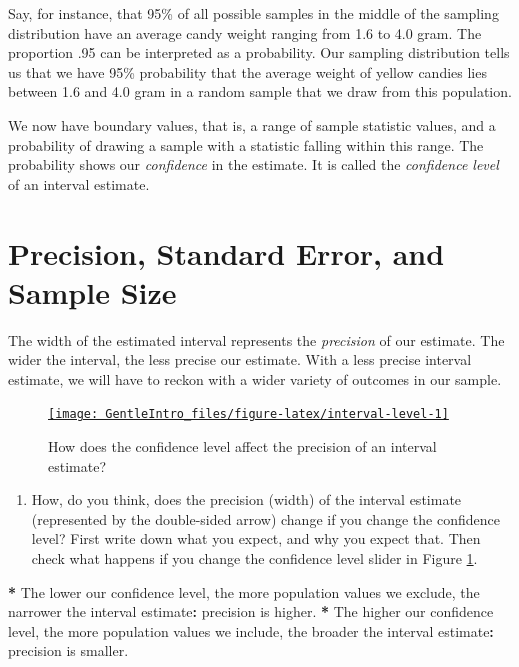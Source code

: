\documentclass[a4paper]{book}
\newenvironment{Shaded}{\begin{snugshade}}{\end{snugshade}}
\newcommand{\StringTok}[1]{\textcolor[rgb]{0.00,0.00,0.00}{#1}}
\newcommand{\OperatorTok}[1]{\textcolor[rgb]{0.00,0.00,0.00}{\textbf{#1}}}
\newcommand{\NormalTok}[1]{#1}
\providecommand{\tightlist}{%
  \setlength{\itemsep}{0pt}\setlength{\parskip}{0pt}}
\theoremstyle{definition}
\theoremstyle{definition}
\theoremstyle{definition}
\theoremstyle{remark}
\begin{document}
Say, for instance, that 95\% of all possible samples in the middle of
the sampling distribution have an average candy weight ranging from 1.6
to 4.0 gram. The proportion .95 can be interpreted as a probability. Our
sampling distribution tells us that we have 95\% probability that the
average weight of yellow candies lies between 1.6 and 4.0 gram in a
random sample that we draw from this population.

We now have boundary values, that is, a range of sample statistic
values, and a probability of drawing a sample with a statistic falling
within this range. The probability shows our \emph{confidence} in the
estimate. It is called the \emph{confidence level} of an interval
estimate.

\section{Precision, Standard Error, and Sample
Size}\label{precisionsesamplesize}

The width of the estimated interval represents the \emph{precision} of
our estimate. The wider the interval, the less precise our estimate.
With a less precise interval estimate, we will have to reckon with a
wider variety of outcomes in our sample.

\begin{figure}[H]
\href{http://82.196.4.233:3838/apps/interval-level/}{\texttt{[image: GentleIntro\_files/figure-latex/interval-level-1]} }\caption{How does the confidence level affect the precision of an interval estimate?}\label{fig:interval-level}
\end{figure}

\begin{enumerate}
\def\labelenumi{\arabic{enumi}.}
\tightlist
\item
  How, do you think, does the precision (width) of the interval estimate
  (represented by the double-sided arrow) change if you change the
  confidence level? First write down what you expect, and why you expect
  that. Then check what happens if you change the confidence level
  slider in Figure \ref{fig:interval-level}.
\end{enumerate}

\begin{Shaded}
\begin{Highlighting}[]
\OperatorTok{*}\StringTok{ }\NormalTok{The lower our confidence level, the more population values we exclude, the}
\NormalTok{narrower the interval estimate}\OperatorTok{:}\StringTok{ }\NormalTok{precision is higher. }
\OperatorTok{*}\StringTok{ }\NormalTok{The higher our confidence level, the more population values we include, the}
\NormalTok{broader the interval estimate}\OperatorTok{:}\StringTok{ }\NormalTok{precision is smaller.}
\end{Highlighting}
\end{Shaded}
\end{document}
